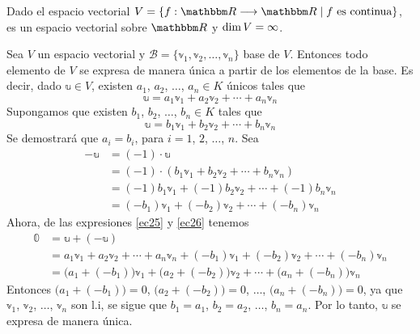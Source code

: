 \begin{remark}
    Dado el espacio vectorial $V = \left\{ f: \RR \longrightarrow \RR \mid f \text{ es continua} \right\}$, es un espacio vectorial sobre $\RR$ y $\operatorname{dim} V = \infty$.
\end{remark}

\begin{theorem}
    Sea $V$ un espacio vectorial y $\mathcal{B} = \{ \mathbb{v}_1,  \mathbb{v}_2,  \dots,  \mathbb{v}_n \}$ base de $V$. Entonces todo elemento de $V$ se expresa de manera única a partir de los elementos de la base. Es decir, dado $\mathbb{u} \in V$, existen $a_1$, $a_2$, $\dots$, $a_n \in K$ únicos tales que
    \begin{equation}
        \mathbb{u} = a_1\mathbb{v}_1 + a_2\mathbb{v}_2 + \cdots + a_n\mathbb{v}_n \label{ec25}
    \end{equation}
    \demostracion Supongamos que existen $b_1$, $b_2$, $\dots$, $b_n \in K$ tales que
    \begin{equation}
        \mathbb{u} = b_1\mathbb{v}_1 + b_2\mathbb{v}_2 + \cdots + b_n\mathbb{v}_n \label{ec26}
    \end{equation}
    Se demostrará que $a_i = b_i$, para $i = 1$, $2$, $\dots$, $n$. Sea
    \begin{align*}
        -\mathbb{u} & = (-1) \cdot \mathbb{u} \\
        & = (-1) \cdot (b_1\mathbb{v}_1 + b_2\mathbb{v}_2 + \cdots + b_n\mathbb{v}_n) \\
        & = (-1)b_1\mathbb{v}_1 + (-1)b_2\mathbb{v}_2 + \cdots + (-1)b_n\mathbb{v}_n \\
        & = (-b_1)\mathbb{v}_1 + (-b_2)\mathbb{v}_2 + \cdots + (-b_n)\mathbb{v}_n
    \end{align*}
    Ahora, de las expresiones \eqref{ec25} y \eqref{ec26} tenemos
    \begin{align*}
        \mathbb{0} & = \mathbb{u} + (-\mathbb{u}) \\
        & = a_1\mathbb{v}_1 + a_2\mathbb{v}_2 + \cdots + a_n\mathbb{v}_n + (-b_1)\mathbb{v}_1 + (-b_2)\mathbb{v}_2 + \cdots + (-b_n)\mathbb{v}_n \\
        & = \big(a_1+(-b_1)\big)\mathbb{v}_1 + \big(a_2+(-b_2)\big)\mathbb{v}_2 + \cdots + \big(a_n+(-b_n)\big)\mathbb{v}_n
    \end{align*}
    Entonces $\big(a_1+(-b_1)\big) = 0$, $\big(a_2+(-b_2)\big) = 0$, $\dots$, $\big(a_n+(-b_n)\big) = 0$, ya que $\mathbb{v}_1$, $\mathbb{v}_2$, $\dots$, $\mathbb{v}_n$ son l.i, se sigue que $b_1 = a_1$, $b_2 = a_2$, $\dots$, $b_n = a_n$. Por lo tanto, $\mathbb{u}$ se expresa de manera única.
\end{theorem}

